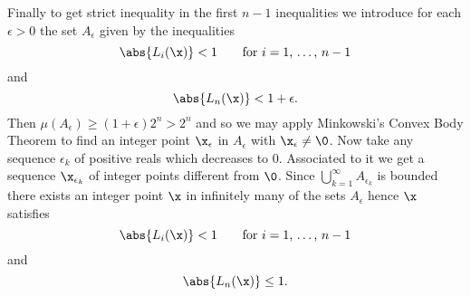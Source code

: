 Finally to get strict inequality in the first $n-1$ inequalities we introduce for each $\epsilon>0$ the set $A_\epsilon$ given by the inequalities
\[ \abs{L_i(\x)}<1 \qquad\text{for $i=1$, $\dotsc$, $n-1$} \]
and
\[ \abs{L_n(\x)}<1+\epsilon . \]
Then $\mu(A_\epsilon)\geq(1+\epsilon)2^n>2^n$ and so we may apply Minkowski's Convex Body Theorem to find an integer point $\x_\epsilon$ in $A_\epsilon$ with $\x_\epsilon\neq\0$.  Now take any sequence $\epsilon_k$ of positive reals which decreases to $0$.  Associated to it we get a sequence $\x_{\epsilon_k}$ of integer points different from $\0$.  Since $\bigcup_{k=1}^\infty A_{\epsilon_k}$ is bounded there exists an integer point $\x$ in infinitely many of the sets $A_\epsilon$ hence $\x$ satisfies
\[ \abs{L_i(\x)}<1 \qquad\text{for $i=1$, $\dotsc$, $n-1$} \]
and
\[ \abs{L_n(\x)}\leq1 . \]
\vspace{-\baselineskip}
